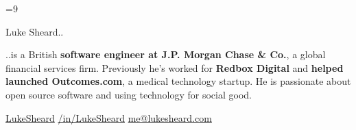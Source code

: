 \documentclass{article}
\begin{document}
\color{body}

=9\relax     %

\raggedright

\fontsize{10pt}{13pt}\selectfont


\begin{minipage}[t]{\textwidth}
  {\Huge
    Luke Sheard..
  }

  {\vspace{10pt}
    ..is a British \textbf{software engineer at J.P. Morgan Chase \& Co.}, a global financial services firm. Previously he's worked for \textbf{Redbox Digital} and \textbf{helped launched Outcomes.com}, a medical technology startup. He is passionate about open source software and using technology for social good. 
  }

  \vspace{5pt}

  \faGithub
  \hspace{3pt}
  \href{https://www.github.com/LukeSheard}{LukeSheard}
  \hspace{20pt}
  \faLinkedin
  \hspace{3pt}
  \href{http://www.linkedin.com/in/lukesheard}{/in/LukeSheard}
  \hspace{20pt}
  \faEnvelope
  \hspace{3pt}
  \href{mailto:me@lukesheard.com}{me@lukesheard.com}

  \vspace{20pt}
\end{minipage}
\end{document}
